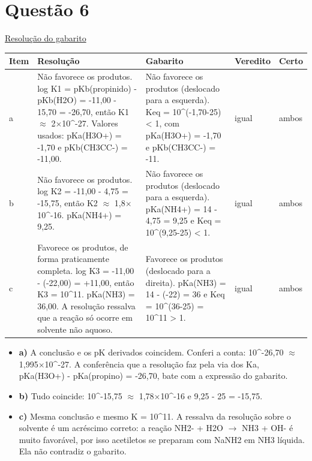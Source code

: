 \documentclass{article}%
\begin{document}
\section*{Questão 6}%
\href{https://poliedroresolve.sistemapoliedro.com.br/vestibulares/ita/2026/ita-2-fase-dia-2-29-10-2025-2-fase-dia-2/dissertativa-6-quimica-2-fase-dia-2-ita-2026}{Resolução do gabarito}\par\smallskip%
\begin{longtable}{@{}p{} p{} p{} p{} p{}@{}}\toprule Item & Resolução & Gabarito & Veredito & Certo \\ \midrule
a & Não favorece os produtos. log K1 = pKb(propinido) - pKb(H2O) = -11,00 - 15,70 = -26,70, então K1 $\approx$ 2$\times$10\^{}{-}27. Valores usados: pKa(H3O+) = -1,70 e pKb(CH3CC-) = -11,00. & Não favorece os produtos (deslocado para a esquerda). Keq = 10\^{}(-1,70-25) < 1, com pKa(H3O+) = -1,70 e pKb(CH3CC-) = -11. & igual & ambos \\
b & Não favorece os produtos. log K2 = -11,00 - 4,75 = -15,75, então K2 $\approx$ 1,8$\times$10\^{}{-}16. pKa(NH4+) = 9,25. & Não favorece os produtos (deslocado para a esquerda). pKa(NH4+) = 14 - 4,75 = 9,25 e Keq = 10\^{}(9,25-25) < 1. & igual & ambos \\
c & Favorece os produtos, de forma praticamente completa. log K3 = -11,00 - (-22,00) = +11,00, então K3 = 10\^{}11. pKa(NH3) = 36,00. A resolução ressalva que a reação só ocorre em solvente não aquoso. & Favorece os produtos (deslocado para a direita). pKa(NH3) = 14 - (-22) = 36 e Keq = 10\^{}(36-25) = 10\^{}11 > 1. & igual & ambos \\
\bottomrule\end{longtable}%
\begin{itemize}%
\item%
\textbf{a)} A conclusão e os pK derivados coincidem. Conferi a conta: 10\^{}{-}26,70 $\approx$ 1,995$\times$10\^{}{-}27. A conferência que a resolução faz pela via dos Ka, pKa(H3O+) - pKa(propino) = -26,70, bate com a expressão do gabarito.%
\item%
\textbf{b)} Tudo coincide: 10\^{}{-}15,75 $\approx$ 1,78$\times$10\^{}{-}16 e 9,25 - 25 = -15,75.%
\item%
\textbf{c)} Mesma conclusão e mesmo K = 10\^{}11. A ressalva da resolução sobre o solvente é um acréscimo correto: a reação NH2- + H2O $\to$ NH3 + OH- é muito favorável, por isso acetiletos se preparam com NaNH2 em NH3 líquida. Ela não contradiz o gabarito.%
\end{itemize}%
\end{document}
